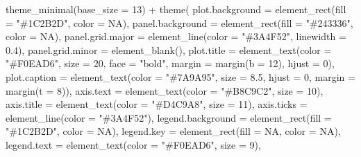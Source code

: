 \documentclass[
  letterpaper,
  DIV=11,
  numbers=noendperiod]{scrartcl}
\newenvironment{Shaded}{\begin{snugshade}}{\end{snugshade}}
\newcommand{\AttributeTok}[1]{\textcolor[rgb]{0.40,0.45,0.13}{#1}}
\newcommand{\ConstantTok}[1]{\textcolor[rgb]{0.56,0.35,0.01}{#1}}
\newcommand{\DecValTok}[1]{\textcolor[rgb]{0.68,0.00,0.00}{#1}}
\newcommand{\FloatTok}[1]{\textcolor[rgb]{0.68,0.00,0.00}{#1}}
\newcommand{\FunctionTok}[1]{\textcolor[rgb]{0.28,0.35,0.67}{#1}}
\newcommand{\NormalTok}[1]{\textcolor[rgb]{0.00,0.23,0.31}{#1}}
\newcommand{\SpecialCharTok}[1]{\textcolor[rgb]{0.37,0.37,0.37}{#1}}
\newcommand{\StringTok}[1]{\textcolor[rgb]{0.13,0.47,0.30}{#1}}
\begin{document}
\begin{Shaded}
\begin{Highlighting}[]
  \FunctionTok{theme\_minimal}\NormalTok{(}\AttributeTok{base\_size =} \DecValTok{13}\NormalTok{) }\SpecialCharTok{+}
  \FunctionTok{theme}\NormalTok{(}
    \AttributeTok{plot.background  =} \FunctionTok{element\_rect}\NormalTok{(}\AttributeTok{fill =} \StringTok{"\#1C2B2D"}\NormalTok{, }\AttributeTok{color =} \ConstantTok{NA}\NormalTok{),}
    \AttributeTok{panel.background =} \FunctionTok{element\_rect}\NormalTok{(}\AttributeTok{fill =} \StringTok{"\#243336"}\NormalTok{, }\AttributeTok{color =} \ConstantTok{NA}\NormalTok{),}
    \AttributeTok{panel.grid.major =} \FunctionTok{element\_line}\NormalTok{(}\AttributeTok{color =} \StringTok{"\#3A4F52"}\NormalTok{, }\AttributeTok{linewidth =} \FloatTok{0.4}\NormalTok{),}
    \AttributeTok{panel.grid.minor =} \FunctionTok{element\_blank}\NormalTok{(),}
    \AttributeTok{plot.title   =} \FunctionTok{element\_text}\NormalTok{(}\AttributeTok{color =} \StringTok{"\#F0EAD6"}\NormalTok{, }\AttributeTok{size =} \DecValTok{20}\NormalTok{, }\AttributeTok{face =} \StringTok{"bold"}\NormalTok{,}
                                \AttributeTok{margin =} \FunctionTok{margin}\NormalTok{(}\AttributeTok{b =} \DecValTok{12}\NormalTok{), }\AttributeTok{hjust =} \DecValTok{0}\NormalTok{),}
    \AttributeTok{plot.caption =} \FunctionTok{element\_text}\NormalTok{(}\AttributeTok{color =} \StringTok{"\#7A9A95"}\NormalTok{, }\AttributeTok{size =} \FloatTok{8.5}\NormalTok{, }\AttributeTok{hjust =} \DecValTok{0}\NormalTok{,}
                                \AttributeTok{margin =} \FunctionTok{margin}\NormalTok{(}\AttributeTok{t =} \DecValTok{8}\NormalTok{)),}
    \AttributeTok{axis.text    =} \FunctionTok{element\_text}\NormalTok{(}\AttributeTok{color =} \StringTok{"\#B8C9C2"}\NormalTok{, }\AttributeTok{size =} \DecValTok{10}\NormalTok{),}
    \AttributeTok{axis.title   =} \FunctionTok{element\_text}\NormalTok{(}\AttributeTok{color =} \StringTok{"\#D4C9A8"}\NormalTok{, }\AttributeTok{size =} \DecValTok{11}\NormalTok{),}
    \AttributeTok{axis.ticks   =} \FunctionTok{element\_line}\NormalTok{(}\AttributeTok{color =} \StringTok{"\#3A4F52"}\NormalTok{),}
    \AttributeTok{legend.background =} \FunctionTok{element\_rect}\NormalTok{(}\AttributeTok{fill =} \StringTok{"\#1C2B2D"}\NormalTok{, }\AttributeTok{color =} \ConstantTok{NA}\NormalTok{),}
    \AttributeTok{legend.key        =} \FunctionTok{element\_rect}\NormalTok{(}\AttributeTok{fill =} \ConstantTok{NA}\NormalTok{, }\AttributeTok{color =} \ConstantTok{NA}\NormalTok{),}
    \AttributeTok{legend.text       =} \FunctionTok{element\_text}\NormalTok{(}\AttributeTok{color =} \StringTok{"\#F0EAD6"}\NormalTok{, }\AttributeTok{size =} \DecValTok{9}\NormalTok{),}

\end{Highlighting}
\end{Shaded}
\end{document}
